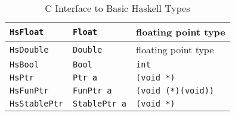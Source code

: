 \documentclass[a4paper,twoside]{article}
\newcommand{\code}[1]{\texttt{#1}}      %
\begin{document}
\begin{table}
\begin{center}
\begin{tabular}{|l|l|l|}
      \hline
      \code{HsFloat}    & \code{Float}
      & floating point type\\
     \hline
      \code{HsDouble}   & \code{Double}
      & floating point type\\
     \hline
      \code{HsBool}     & \code{Bool}
      & \code{int}\\
     \hline
      \code{HsPtr}      & \code{Ptr a}
      & \code{(void *)}\\
     \hline
      \code{HsFunPtr}   & \code{FunPtr a}
      & \code{(void (*)(void))}\\
     \hline
      \code{HsStablePtr}& \code{StablePtr a}
      & \code{(void *)}\\
     \hline
    \end{tabular}
    \caption{C Interface to Basic Haskell Types}
    \label{tab:c-haskell-types}
  \end{center}
\end{table}
%
\end{document}
